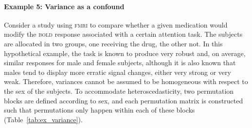 \paragraph{Example 5: Variance as a confound} Consider a study using \textsc{fmri} to compare whether a given medication would modify the \textsc{bold} response associated with a certain attention task. The subjects are allocated in two groups, one receiving the drug, the other not. In this hypothetical example, the task is known to produce very robust and, on average, similar responses for male and female subjects, although it is also known that males tend to display more erratic signal changes, either very strong or very weak. Therefore, variances cannot be assumed to be homogeneous with respect to the sex of the subjects. To accommodate heteroscedasticity, two permutation blocks are defined according to sex, and each permutation matrix is constructed such that permutations only happen within each of these blocks (Table~\ref{tab:ex_variance}).

